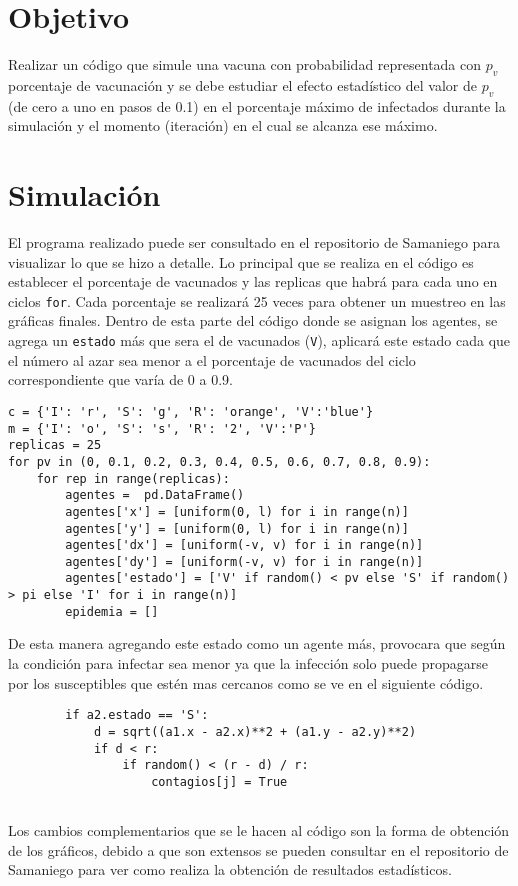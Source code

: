 \documentclass[a4paper, 11pt]{article}
\begin{document}
\section{Objetivo}
Realizar un código que simule una vacuna con probabilidad representada con $p_v$ porcentaje de vacunación y se debe estudiar el efecto estadístico del valor de $p_v$ (de cero a uno en pasos de 0.1) en el porcentaje máximo de infectados durante la simulación y el momento (iteración) en el cual se alcanza ese máximo.


\section{Simulación}
El programa realizado puede ser consultado en el repositorio de Samaniego \cite{Edson} para visualizar lo que se hizo a detalle.
Lo principal que se realiza en el código es establecer el porcentaje de vacunados y las replicas que habrá para cada uno en ciclos \texttt{for}. Cada porcentaje se realizará 25 veces para obtener un muestreo en las gráficas finales.
Dentro de esta parte del código donde se asignan los agentes, se agrega un \texttt{estado} más que sera el de vacunados (\texttt{V}), aplicará este estado cada que el número al azar sea menor a el porcentaje de vacunados del ciclo correspondiente que varía de 0 a 0.9.
\begin{verbatim}
c = {'I': 'r', 'S': 'g', 'R': 'orange', 'V':'blue'}
m = {'I': 'o', 'S': 's', 'R': '2', 'V':'P'}
replicas = 25
for pv in (0, 0.1, 0.2, 0.3, 0.4, 0.5, 0.6, 0.7, 0.8, 0.9):
    for rep in range(replicas):
        agentes =  pd.DataFrame()
        agentes['x'] = [uniform(0, l) for i in range(n)]
        agentes['y'] = [uniform(0, l) for i in range(n)]
        agentes['dx'] = [uniform(-v, v) for i in range(n)]
        agentes['dy'] = [uniform(-v, v) for i in range(n)]        
        agentes['estado'] = ['V' if random() < pv else 'S' if random() > pi else 'I' for i in range(n)]
        epidemia = []
\end{verbatim}
De esta manera agregando este estado como un agente más, provocara que según la condición para infectar sea menor ya que la infección solo puede propagarse por los susceptibles que estén mas cercanos como se ve en el siguiente código.
\begin{verbatim}
        if a2.estado == 'S':  
            d = sqrt((a1.x - a2.x)**2 + (a1.y - a2.y)**2) 
            if d < r:   
                if random() < (r - d) / r:
                    contagios[j] = True 
    
\end{verbatim}
Los cambios complementarios que se le hacen al código son la forma de obtención de los gráficos, debido a que son extensos se pueden consultar en el repositorio de Samaniego \cite{Edson} para ver como realiza la obtención de resultados estadísticos.
\end{document}
